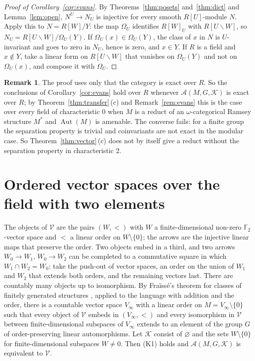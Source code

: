 \documentclass[11pt,a4paper]{article}
\theoremstyle{definition}
\newtheorem{remark}[theorem]{Remark}
\newcommand{\A}{\mathcal{A}}
\newcommand{\K}{\mathcal{K}}
\newcommand{\V}{\mathcal{V}}
\newcommand{\F}{\mathbb{F}}
\newcommand{\Aut}{\operatorname{Aut}}
\begin{document}
\begin{proof}[Proof of Corollary~\ref{cor:evans}]
By Theorems~\ref{thm:posets} and~\ref{thm:dict} and Lemma~\ref{lem:open},
$N^U\to N_U$ is injective for every smooth $R[U]$-module $N$. Apply this to
$N=R[W]/Y$: the map $\Omega_U$ identifies $R[W]_U$ with $R[U\backslash W]$,
so $N_U=R[U\backslash W]/\Omega_U(Y)$. If $\Omega_U(x)\in\Omega_U(Y)$, the
class of $x$ in $N$ is $U$-invariant and goes to zero in $N_U$, hence is
zero, and $x\in Y$. If $R$ is a field and $x\notin Y$, take a linear form on
$R[U\backslash W]$ that vanishes on $\Omega_U(Y)$ and not on $\Omega_U(x)$,
and compose it with $\Omega_U$.
\end{proof}

\begin{remark}\label{rem:reducts}
The proof uses only that the category is exact over $R$. So the conclusions
of Corollary~\ref{cor:evans} hold over $R$ whenever $\A(M,G,\K)$ is exact
over $R$; by Theorem~\ref{thm:transfer}\,(c) and Remark~\ref{rem:evans} this
is the case over every field of characteristic $0$ when $M$ is a reduct of
an $\omega$-categorical Ramsey structure $M^*$ and $\Aut(M)$ is amenable.
The converse fails: for a finite group the separation property is trivial
and coinvariants are not exact in the modular case. So
Theorem~\ref{thm:vector}\,(c) does not by itself give a reduct without the
separation property in characteristic $2$.
\end{remark}

\section{Ordered vector spaces over the field with two
elements}\label{sec:vector}

The objects of $\V$ are the pairs $(W,<)$ with $W$ a finite-dimensional
non-zero $\F_2$-vector space and $<$ a linear order on $W\setminus\{0\}$; the
arrows are the injective linear maps that preserve the order. Two objects
embed in a third, and two arrows $W_0\to W_1$, $W_0\to W_2$ can be completed
to a commutative square in which $W_1\cap W_2=W_0$: take the push-out of
vector spaces, an order on the union of $W_1$ and $W_2$ that extends both
orders, and the remaining vectors last. There are countably many objects up
to isomorphism. By Fra\"iss\'e's theorem for classes of finitely generated
structures \cite[\S7.1]{Ho}, applied to the language with addition and the
order, there is a countable vector space $V_\infty$ with a linear order on
$M=V_\infty\setminus\{0\}$ such that every object of $\V$ embeds in
$(V_\infty,<)$ and every isomorphism in $\V$ between finite-dimensional
subspaces of $V_\infty$ extends to an element of the group $G$ of
order-preserving linear automorphisms. Let $\K$ consist of $\varnothing$
and the sets $W\setminus\{0\}$ for finite-dimensional subspaces $W\ne0$.
Then \textup{(K1)} holds and $\A(M,G,\K)$ is equivalent to $\V$.
\end{document}
